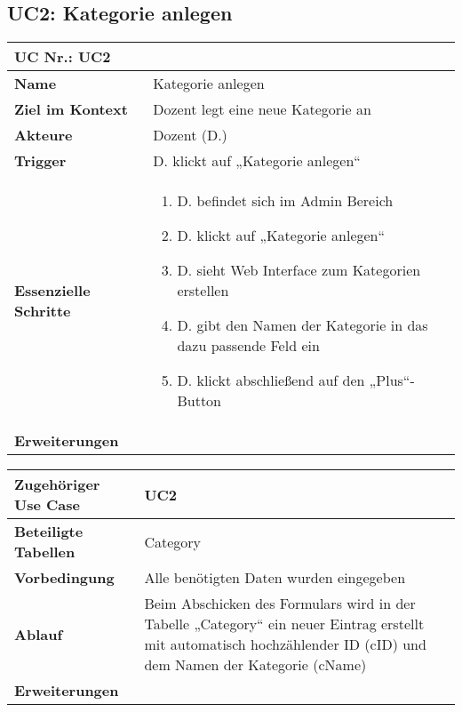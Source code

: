 \begin{table}
\subsection{UC2: Kategorie anlegen}
	\begin{tabular}{|p{3cm}|p{11.06cm}|}
	\hline
		\multicolumn{2}{|l|}{\textbf{UC Nr.: UC2} }   \\ \hline
		\textbf{Name}                 &     Kategorie anlegen   \\ \hline
		\textbf{Ziel im Kontext}      &     Dozent legt eine neue Kategorie an   \\ \hline
		\textbf{Akteure}              &     Dozent (D.)    \\ \hline
		\textbf{Trigger}              &     D. klickt auf „Kategorie anlegen“    \\ \hline
		\textbf{Essenzielle Schritte} & 
			\begin{enumerate} 
			  \item D. befindet sich im Admin Bereich
			  \item D. klickt auf „Kategorie anlegen“
			  \item D. sieht Web Interface zum Kategorien erstellen
			  \item D. gibt den Namen der Kategorie in das dazu passende Feld ein
			  \item	D. klickt abschließend auf den „Plus“-Button
			\end{enumerate}
		\\ \hline
		\textbf{Erweiterungen} 		  &         \\ \hline
	\end{tabular}
\end{table}\FloatBarrier

\begin{table}[h]
	\begin{tabular}{|p{3cm}|p{11.06cm}|}
	\hline
		\textbf{Zugehöriger Use Case}                 &     UC2    \\ \hline
		\textbf{Beteiligte Tabellen}      &     Category    \\ \hline
		\textbf{Vorbedingung}              &    Alle benötigten Daten wurden eingegeben     \\ \hline
		\textbf{Ablauf}              &    Beim Abschicken des Formulars wird in der Tabelle „Category“ ein neuer Eintrag erstellt mit automatisch hochzählender ID (cID) und dem Namen der Kategorie (cName)
		\\ \hline
		\textbf{Erweiterungen}              &         \\ \hline
	\end{tabular}
\end{table}\FloatBarrier

